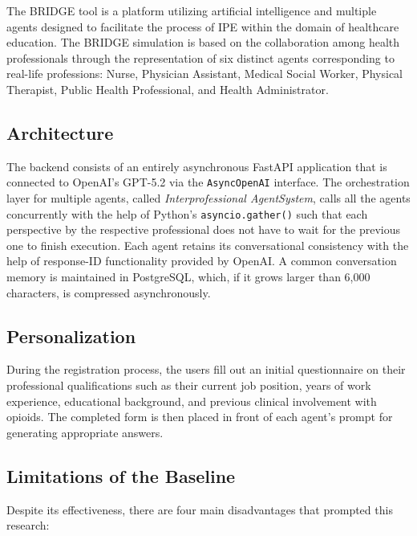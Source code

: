 \documentclass[pdflatex,sn-mathphys-num]{sn-jnl}
\theoremstyle{thmstyleone}
\theoremstyle{thmstyletwo}
\theoremstyle{thmstylethree}
\begin{document}
The BRIDGE tool is a platform utilizing artificial intelligence and multiple agents designed to facilitate the process of IPE within the domain of healthcare education. The BRIDGE simulation is based on the collaboration among health professionals through the representation of six distinct agents corresponding to real-life professions: Nurse, Physician Assistant, Medical Social Worker, Physical Therapist, Public Health Professional, and Health Administrator.

\subsection{Architecture}

The backend consists of an entirely asynchronous FastAPI application that is connected to OpenAI’s GPT-5.2 via the \texttt{AsyncOpenAI} interface. The orchestration layer for multiple agents, called \textit{Interprofessional AgentSystem}, calls all the agents concurrently with the help of Python’s \texttt{asyncio.gather()} such that each perspective by the respective professional does not have to wait for the previous one to finish execution. Each agent retains its conversational consistency with the help of response-ID functionality provided by OpenAI. A common conversation memory is maintained in PostgreSQL, which, if it grows larger than 6{,}000 characters, is compressed asynchronously.

\subsection{Personalization}

During the registration process, the users fill out an initial questionnaire on their professional qualifications such as their current job position, years of work experience, educational background, and previous clinical involvement with opioids. The completed form is then placed in front of each agent’s prompt for generating appropriate answers.

\subsection{Limitations of the Baseline}

Despite its effectiveness, there are four main disadvantages that prompted this research:
\end{document}
